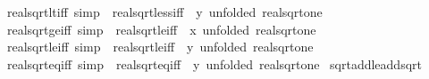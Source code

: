 \begin{isabellebody}
\isamarkupfalse%
\ real{\isacharunderscore}{\kern0pt}sqrt{\isacharunderscore}{\kern0pt}lt{\isacharunderscore}{\kern0pt}{}{\isacharunderscore}{\kern0pt}iff\ {\isacharbrackleft}{\kern0pt}simp{\isacharbrackright}{\kern0pt}\ {\isacharequal}{\kern0pt}\ real{\isacharunderscore}{\kern0pt}sqrt{\isacharunderscore}{\kern0pt}less{\isacharunderscore}{\kern0pt}iff\ {\isacharbrackleft}{\kern0pt}\ y{\isacharequal}{\kern0pt}{}{\isacharcomma}{\kern0pt}\ unfolded\ real{\isacharunderscore}{\kern0pt}sqrt{\isacharunderscore}{\kern0pt}one{\isacharbrackright}{\kern0pt}\isanewline
{}\isamarkupfalse%
\ real{\isacharunderscore}{\kern0pt}sqrt{\isacharunderscore}{\kern0pt}ge{\isacharunderscore}{\kern0pt}{}{\isacharunderscore}{\kern0pt}iff\ {\isacharbrackleft}{\kern0pt}simp{\isacharbrackright}{\kern0pt}\ {\isacharequal}{\kern0pt}\ real{\isacharunderscore}{\kern0pt}sqrt{\isacharunderscore}{\kern0pt}le{\isacharunderscore}{\kern0pt}iff\ {\isacharbrackleft}{\kern0pt}\ x{\isacharequal}{\kern0pt}{}{\isacharcomma}{\kern0pt}\ unfolded\ real{\isacharunderscore}{\kern0pt}sqrt{\isacharunderscore}{\kern0pt}one{\isacharbrackright}{\kern0pt}\isanewline
{}\isamarkupfalse%
\ real{\isacharunderscore}{\kern0pt}sqrt{\isacharunderscore}{\kern0pt}le{\isacharunderscore}{\kern0pt}{}{\isacharunderscore}{\kern0pt}iff\ {\isacharbrackleft}{\kern0pt}simp{\isacharbrackright}{\kern0pt}\ {\isacharequal}{\kern0pt}\ real{\isacharunderscore}{\kern0pt}sqrt{\isacharunderscore}{\kern0pt}le{\isacharunderscore}{\kern0pt}iff\ {\isacharbrackleft}{\kern0pt}\ y{\isacharequal}{\kern0pt}{}{\isacharcomma}{\kern0pt}\ unfolded\ real{\isacharunderscore}{\kern0pt}sqrt{\isacharunderscore}{\kern0pt}one{\isacharbrackright}{\kern0pt}\isanewline
{}\isamarkupfalse%
\ real{\isacharunderscore}{\kern0pt}sqrt{\isacharunderscore}{\kern0pt}eq{\isacharunderscore}{\kern0pt}{}{\isacharunderscore}{\kern0pt}iff\ {\isacharbrackleft}{\kern0pt}simp{\isacharbrackright}{\kern0pt}\ {\isacharequal}{\kern0pt}\ real{\isacharunderscore}{\kern0pt}sqrt{\isacharunderscore}{\kern0pt}eq{\isacharunderscore}{\kern0pt}iff\ {\isacharbrackleft}{\kern0pt}\ y{\isacharequal}{\kern0pt}{}{\isacharcomma}{\kern0pt}\ unfolded\ real{\isacharunderscore}{\kern0pt}sqrt{\isacharunderscore}{\kern0pt}one{\isacharbrackright}{\kern0pt}\isanewline
\isanewline
{}\isamarkupfalse%
\ sqrt{\isacharunderscore}{\kern0pt}add{\isacharunderscore}{\kern0pt}le{\isacharunderscore}{\kern0pt}add{\isacharunderscore}{\kern0pt}sqrt{\isacharcolon}{\kern0pt}\isanewline

\end{isabellebody}
